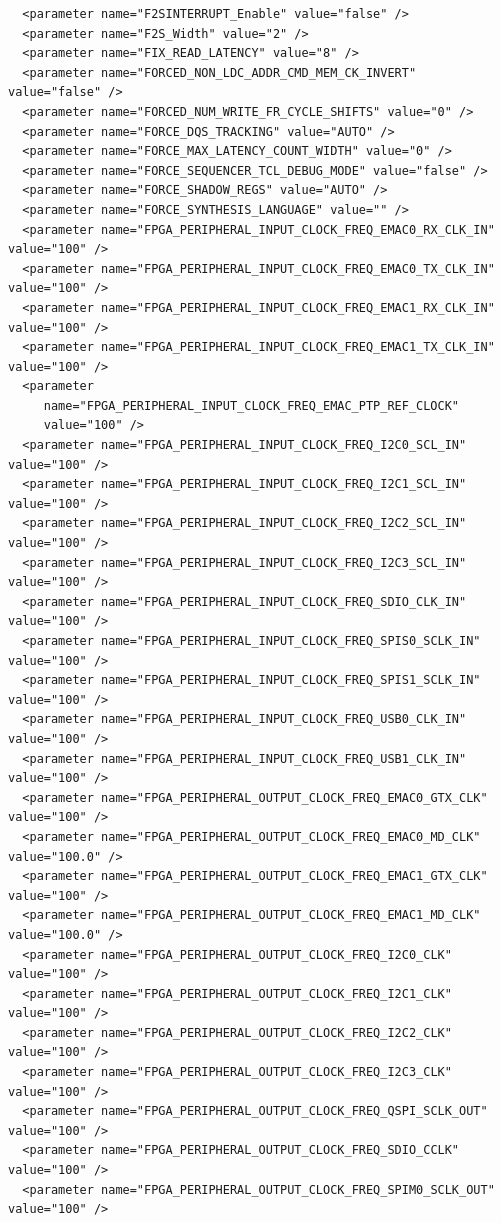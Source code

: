 \documentclass[conference]{IEEEtran}
\begin{document}
\begin{lstlisting}
  <parameter name="F2SINTERRUPT_Enable" value="false" />
  <parameter name="F2S_Width" value="2" />
  <parameter name="FIX_READ_LATENCY" value="8" />
  <parameter name="FORCED_NON_LDC_ADDR_CMD_MEM_CK_INVERT" value="false" />
  <parameter name="FORCED_NUM_WRITE_FR_CYCLE_SHIFTS" value="0" />
  <parameter name="FORCE_DQS_TRACKING" value="AUTO" />
  <parameter name="FORCE_MAX_LATENCY_COUNT_WIDTH" value="0" />
  <parameter name="FORCE_SEQUENCER_TCL_DEBUG_MODE" value="false" />
  <parameter name="FORCE_SHADOW_REGS" value="AUTO" />
  <parameter name="FORCE_SYNTHESIS_LANGUAGE" value="" />
  <parameter name="FPGA_PERIPHERAL_INPUT_CLOCK_FREQ_EMAC0_RX_CLK_IN" value="100" />
  <parameter name="FPGA_PERIPHERAL_INPUT_CLOCK_FREQ_EMAC0_TX_CLK_IN" value="100" />
  <parameter name="FPGA_PERIPHERAL_INPUT_CLOCK_FREQ_EMAC1_RX_CLK_IN" value="100" />
  <parameter name="FPGA_PERIPHERAL_INPUT_CLOCK_FREQ_EMAC1_TX_CLK_IN" value="100" />
  <parameter
     name="FPGA_PERIPHERAL_INPUT_CLOCK_FREQ_EMAC_PTP_REF_CLOCK"
     value="100" />
  <parameter name="FPGA_PERIPHERAL_INPUT_CLOCK_FREQ_I2C0_SCL_IN" value="100" />
  <parameter name="FPGA_PERIPHERAL_INPUT_CLOCK_FREQ_I2C1_SCL_IN" value="100" />
  <parameter name="FPGA_PERIPHERAL_INPUT_CLOCK_FREQ_I2C2_SCL_IN" value="100" />
  <parameter name="FPGA_PERIPHERAL_INPUT_CLOCK_FREQ_I2C3_SCL_IN" value="100" />
  <parameter name="FPGA_PERIPHERAL_INPUT_CLOCK_FREQ_SDIO_CLK_IN" value="100" />
  <parameter name="FPGA_PERIPHERAL_INPUT_CLOCK_FREQ_SPIS0_SCLK_IN" value="100" />
  <parameter name="FPGA_PERIPHERAL_INPUT_CLOCK_FREQ_SPIS1_SCLK_IN" value="100" />
  <parameter name="FPGA_PERIPHERAL_INPUT_CLOCK_FREQ_USB0_CLK_IN" value="100" />
  <parameter name="FPGA_PERIPHERAL_INPUT_CLOCK_FREQ_USB1_CLK_IN" value="100" />
  <parameter name="FPGA_PERIPHERAL_OUTPUT_CLOCK_FREQ_EMAC0_GTX_CLK" value="100" />
  <parameter name="FPGA_PERIPHERAL_OUTPUT_CLOCK_FREQ_EMAC0_MD_CLK" value="100.0" />
  <parameter name="FPGA_PERIPHERAL_OUTPUT_CLOCK_FREQ_EMAC1_GTX_CLK" value="100" />
  <parameter name="FPGA_PERIPHERAL_OUTPUT_CLOCK_FREQ_EMAC1_MD_CLK" value="100.0" />
  <parameter name="FPGA_PERIPHERAL_OUTPUT_CLOCK_FREQ_I2C0_CLK" value="100" />
  <parameter name="FPGA_PERIPHERAL_OUTPUT_CLOCK_FREQ_I2C1_CLK" value="100" />
  <parameter name="FPGA_PERIPHERAL_OUTPUT_CLOCK_FREQ_I2C2_CLK" value="100" />
  <parameter name="FPGA_PERIPHERAL_OUTPUT_CLOCK_FREQ_I2C3_CLK" value="100" />
  <parameter name="FPGA_PERIPHERAL_OUTPUT_CLOCK_FREQ_QSPI_SCLK_OUT" value="100" />
  <parameter name="FPGA_PERIPHERAL_OUTPUT_CLOCK_FREQ_SDIO_CCLK" value="100" />
  <parameter name="FPGA_PERIPHERAL_OUTPUT_CLOCK_FREQ_SPIM0_SCLK_OUT" value="100" />

\end{lstlisting}
\end{document}

